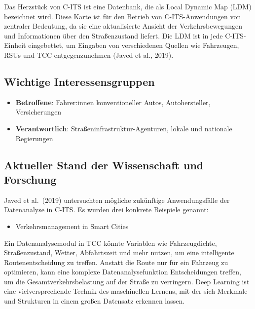 \documentclass[
]{book}
\providecommand{\tightlist}{%
  \setlength{\itemsep}{0pt}\setlength{\parskip}{0pt}}
\begin{document}
Das Herzstück von C-ITS ist eine Datenbank, die als Local Dynamic Map (LDM) bezeichnet wird. Diese Karte ist für den Betrieb von C-ITS-Anwendungen von zentraler Bedeutung, da sie eine aktualisierte Ansicht der Verkehrsbewegungen und Informationen über den Straßenzustand liefert. Die LDM ist in jede C-ITS-Einheit eingebettet, um Eingaben von verschiedenen Quellen wie Fahrzeugen, RSUs und TCC entgegenzunehmen (Javed et al., 2019).

\hypertarget{wichtige-interessensgruppen-12}{%
\subsection*{Wichtige Interessensgruppen}\label{wichtige-interessensgruppen-12}}

\begin{itemize}
\tightlist
\item
  \textbf{Betroffene}: Fahrer:innen konventioneller Autos, Autohersteller, Versicherungen
\item
  \textbf{Verantwortlich}: Straßeninfrastruktur-Agenturen, lokale und nationale Regierungen
\end{itemize}

\hypertarget{aktueller-stand-der-wissenschaft-und-forschung-12}{%
\subsection*{Aktueller Stand der Wissenschaft und Forschung}\label{aktueller-stand-der-wissenschaft-und-forschung-12}}

Javed et al.~(2019) untersuchten mögliche zukünftige Anwendungsfälle der Datenanalyse in C-ITS. Es wurden drei konkrete Beispiele genannt:

\begin{itemize}
\tightlist
\item
  Verkehrsmanagement in Smart Cities
\end{itemize}

Ein Datenanalysemodul in TCC könnte Variablen wie Fahrzeugdichte, Straßenzustand, Wetter, Abfahrtszeit und mehr nutzen, um eine intelligente Routenentscheidung zu treffen. Anstatt die Route nur für ein Fahrzeug zu optimieren, kann eine komplexe Datenanalysefunktion Entscheidungen treffen, um die Gesamtverkehrsbelastung auf der Straße zu verringern. Deep Learning ist eine vielversprechende Technik des maschinellen Lernens, mit der sich Merkmale und Strukturen in einem großen Datensatz erkennen lassen.
\end{document}
